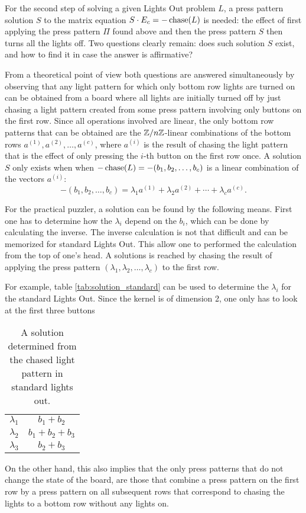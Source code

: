 For the second step of solving a given Lights Out problem
$L$, a press pattern solution $S$ to the matrix
equation $S\cdot E_c=-\operatorname{chase}(L)$ is needed:
the effect of first applying the press pattern
$\Pi$ found above and then the press pattern $S$ then turns all the lights off.
Two questions clearly remain: does such solution $S$ exist, and how
to find it in case the answer is affirmative?

From a theoretical point of view
both questions are answered simultaneously by observing that
any light pattern for which only bottom row lights are turned on
can be obtained from a board where all lights are initially turned off
by just chasing a light pattern created from some
press pattern involving only buttons on the first row.
Since all operations involved are linear, the only bottom row patterns
that can be obtained are the $\mathbb{Z}/n\mathbb{Z}$-linear combinations of the
bottom rows $a^{(1)}, a^{(2)}, \ldots, a^{(c)}$, where $a^{(i)}$ is the result of
chasing the light pattern that is the effect of only pressing the $i$-th
button on the first row once. A solution $S$ only exists when
when $-\operatorname{chase}(L)=-(b_1, b_2, \ldots, b_c)$ is a linear combination
of the vectors $a^{(i)}$:
$$-(b_1, b_2, \ldots, b_c)=\lambda_1a^{(1)}+\lambda_2a^{(2)}+\cdots+\lambda_ca^{(c)}.$$

For the practical puzzler, a solution can be found by the following means. First one has
to determine how the $\lambda_{i}$ depend on the $b_{i}$, which can be done by calculating the inverse.
The inverse calculation is not that difficult and can be memorized for standard Lights Out.
This allow one to performed the calculation from the top of one's head.
A solutions is reached by chasing the result of applying the press pattern 
$(\lambda_1, \lambda_2, \ldots, \lambda_c)$ to the first row.

For example, table \ref{tab:solution_standard} can be used to determine the $\lambda_{i}$ for the standard Lights Out. Since the kernel is of dimension 2, one only has to look at the first three buttons

\begin{table}\label{tab:solution_standard}
  \begin{center}
    \begin{tabular}{|c|c|}
      \hline
      \hline
$\lambda_1$ & $b_1 + b_2$\\
$\lambda_2$ & $b_1 + b_2 + b_3$\\
$\lambda_3$ & $b_2 + b_3$\\
        \hline
    \end{tabular}
  \end{center}
  \caption{A solution determined from the chased light pattern in standard lights out.}
  \label{tab:solution}
\end{table}

On the other hand, this also implies that the only press patterns
that do not change the state of the board, are those that combine
a press pattern on the first row by a press pattern on all subsequent
rows that correspond to chasing the lights to a bottom row without any
lights on.

